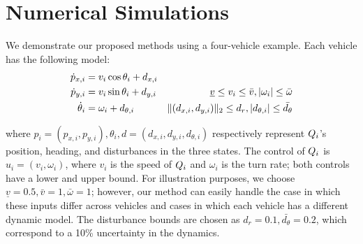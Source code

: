 \section{Numerical Simulations \label{sec:sim}}
We demonstrate our proposed methods using a four-vehicle example. Each vehicle has the following model:
\vspace{-0.2em}
\begin{equation*}
\label{eq:dyn_i}
\begin{aligned}
\dot{p}_{x,i} &= v_i \cos \theta_i + d_{x,i} &\\
\dot{p}_{y,i} &= v_i \sin \theta_i + d_{y,i} & \underline{v} \le v_i \le \bar{v}, |\omega_i| \le \bar{\omega}\\
\dot{\theta}_i &= \omega_i + d_{\theta,i} & \|(d_{x,i}, d_{y,i}) \|_2 \le d_{r}, |d_{\theta,i}| \le \bar{d_{\theta}}\\
\end{aligned}
\end{equation*}

\noindent where $p_i = (p_{x,i}, p_{y,i}), \theta_i, d = (d_{x,i}, d_{y,i}, d_{\theta,i})$ respectively represent $Q_i$'s position, heading, and disturbances in the three states. The control of $Q_i$ is $u_i = (v_i, \omega_i)$, where $v_i$ is the speed of $Q_i$ and $\omega_i$ is the turn rate; both controls have a lower and upper bound. For illustration purposes, we choose $\underline{v} = 0.5, \bar{v} = 1, \bar\omega = 1$; however, our method can easily handle the case in which these inputs differ across vehicles and cases in which each vehicle has a different dynamic model. The disturbance bounds are chosen as $d_{r} = 0.1, \bar{d_{\theta}} = 0.2$, which correspond to a 10\% uncertainty in the dynamics. %

%

